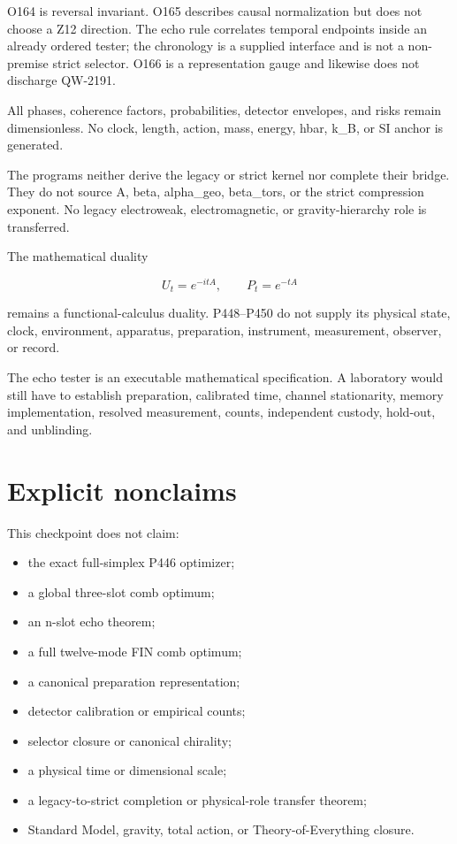 \documentclass[11pt,a4paper,openany]{report}
\begin{document}
O164 is reversal invariant. O165 describes causal normalization but does not choose a Z12 direction. The echo rule correlates temporal endpoints inside an already ordered tester; the chronology is a supplied interface and is not a non-premise strict selector. O166 is a representation gauge and likewise does not discharge QW-2191.

All phases, coherence factors, probabilities, detector envelopes, and risks remain dimensionless. No clock, length, action, mass, energy, hbar, k\_B, or SI anchor is generated.

The programs neither derive the legacy or strict kernel nor complete their bridge. They do not source A, beta, alpha\_geo, beta\_tors, or the strict compression exponent. No legacy electroweak, electromagnetic, or gravity-hierarchy role is transferred.

The mathematical duality

\[
U_t=e^{-itA},
\qquad
P_t=e^{-tA}
\]

remains a functional-calculus duality. P448--P450 do not supply its physical state, clock, environment, apparatus, preparation, instrument, measurement, observer, or record.

The echo tester is an executable mathematical specification. A laboratory would still have to establish preparation, calibrated time, channel stationarity, memory implementation, resolved measurement, counts, independent custody, hold-out, and unblinding.

\chapter{Explicit nonclaims}

This checkpoint does not claim:

\begin{itemize}
\item 
the exact full-simplex P446 optimizer;

\item 
a global three-slot comb optimum;

\item 
an n-slot echo theorem;

\item 
a full twelve-mode FIN comb optimum;

\item 
a canonical preparation representation;

\item 
detector calibration or empirical counts;

\item 
selector closure or canonical chirality;

\item 
a physical time or dimensional scale;

\item 
a legacy-to-strict completion or physical-role transfer theorem;

\item 
Standard Model, gravity, total action, or Theory-of-Everything closure.

\end{itemize}
\end{document}
